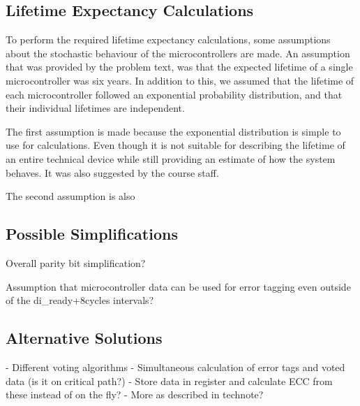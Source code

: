 \subsection{Lifetime Expectancy Calculations}
To perform the required lifetime expectancy calculations, some
assumptions about the stochastic behaviour of the microcontrollers are
made. An assumption that was provided by the problem text, was that
the expected lifetime of a single microcontroller was six years. In
addition to this, we assumed that the lifetime of each microcontroller
followed an exponential probability distribution, and that their
individual lifetimes are independent. 

The first assumption is made because the exponential distribution is
simple to use for calculations. Even though it is not suitable for describing the lifetime of an entire technical device\cite{wikipedia} while still providing an estimate of
how the system behaves. It was also suggested by the course staff. 

The second assumption is also 

\subsection{Possible Simplifications}
Overall parity bit simplification?

Assumption that microcontroller data can be used for error tagging
even outside of the di_ready+8cycles intervals?

\subsection{Alternative Solutions}
- Different voting algorithms
- Simultaneous calculation of error tags and voted data (is it on critical path?)
- Store data in register and calculate ECC from these instead of on the fly?
- More as described in technote?